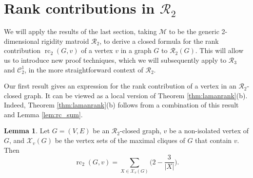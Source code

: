 \documentclass[11pt,a4paper]{article}
\theoremstyle{definition}
\newtheorem{lemma}[theorem]{Lemma}
\DeclareMathOperator{\rc}{rc}
\newcommand{\cR}{\mathcal{R}}
\newcommand{\cM}{\mathcal{M}}
\newcommand{\cC}{\mathcal{C}}
\begin{document}
\section{Rank contributions in $\mathcal{R}_2$}

We will apply the results of the last section, taking $\cM$ to be the generic 2-dimensional rigidity matroid $\cR_2$, 
to derive a closed formula for the rank contribution  $\rc_2(G,v)$ of a vertex $v$ in a graph $G$
to $\cR_2(G)$. This will allow us to introduce new proof techniques, which we will subsequently apply to $\cR_3$ and $\cC_2^1$, in the more straightforward context of $\cR_2$. 


Our first result gives an expression for the rank contribution of a vertex in an $\cR_2$-closed graph. It can be viewed as a local version of Theorem \ref{thm:lamanrank}(b). Indeed,  Theorem \ref{thm:lamanrank}(b)  follows from a  combination of this result and Lemma \ref{lem:rc_sum}.

\begin{lemma}
\label{2dimlocal}
Let $G=(V,E)$ be an $\mathcal{R}_2$-closed graph, $v$ be a non-isolated vertex of $G$, and $\mathcal{X}_v(G)$ be the vertex sets of the maximal cliques of $G$ that contain $v$.
Then $$\rc_2(G,v)=\sum_{X\in \mathcal{X}_v(G)}\Big(2-\frac{3}{|X|}\Big).$$
\end{lemma}
\end{document}
